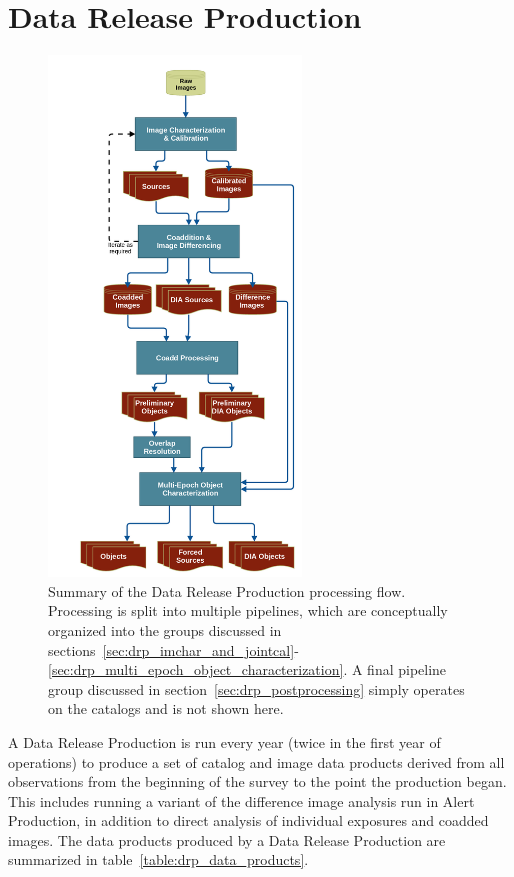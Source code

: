 \section{Data Release Production}
\label{sec:drp}

\begin{figure}
\centering
\includegraphics[width=0.6\textwidth]{figures/drp_summary.png}
\caption{Summary of the Data Release Production processing flow.  Processing is split into multiple pipelines, which are conceptually organized into the groups discussed in sections~\ref{sec:drp_imchar_and_jointcal}-\ref{sec:drp_multi_epoch_object_characterization}.  A final pipeline group discussed in section~\ref{sec:drp_postprocessing} simply operates on the catalogs and is not shown here.
\label{fig:drp_summary}}
\end{figure}

A Data Release Production is run every year (twice in the first year of operations) to produce a set of catalog and image data products derived from all observations from the beginning of the survey to the point the production began.  This includes running a variant of the difference image analysis run in Alert Production, in addition to direct analysis of individual exposures and coadded images.  The data products produced by a Data Release Production are summarized in table~\ref{table:drp_data_products}.



